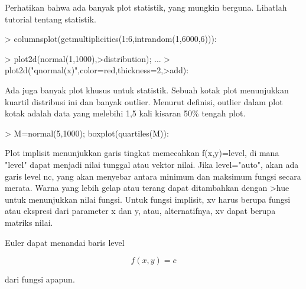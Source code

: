 \documentclass[a4paper,10pt]{article}
\begin{document}
\begin{eulernotebook}
\begin{eulercomment}
\begin{eulercomment}
\begin{eulercomment}
\begin{eulercomment}
\begin{eulercomment}
\begin{eulercomment}
\begin{eulerprompt}
\end{eulerprompt}
\begin{eulercomment}
Perhatikan bahwa ada banyak plot statistik, yang mungkin berguna.
Lihatlah tutorial tentang statistik.
\end{eulercomment}
\begin{eulerprompt}
> columnsplot(getmultiplicities(1:6,intrandom(1,6000,6))):
\end{eulerprompt}
\begin{eulerprompt}
> plot2d(normal(1,1000),>distribution); ...
>   plot2d("qnormal(x)",color=red,thickness=2,>add):
\end{eulerprompt}
\begin{eulercomment}
Ada juga banyak plot khusus untuk statistik. Sebuah kotak plot
menunjukkan kuartil distribusi ini dan banyak outlier. Menurut
definisi, outlier dalam plot kotak adalah data yang melebihi 1,5 kali
kisaran 50\% tengah plot.
\end{eulercomment}
\begin{eulerprompt}
> M=normal(5,1000); boxplot(quartiles(M)):
\end{eulerprompt}
\begin{eulercomment}
Plot implisit menunjukkan garis tingkat memecahkan f(x,y)=level, di
mana "level" dapat menjadi nilai tunggal atau vektor nilai. Jika
level="auto", akan ada garis level nc, yang akan menyebar antara
minimum dan maksimum fungsi secara merata. Warna yang lebih gelap atau
terang dapat ditambahkan dengan \textgreater{}hue untuk menunjukkan nilai fungsi.
Untuk fungsi implisit, xv harus berupa fungsi atau ekspresi dari
parameter x dan y, atau, alternatifnya, xv dapat berupa matriks nilai.

Euler dapat menandai baris level

\end{eulercomment}
\begin{eulerformula}
\[
f(x,y) = c
\]
\end{eulerformula}
\begin{eulercomment}
dari fungsi apapun.


\end{eulercomment}
\end{eulercomment}
\end{eulercomment}
\end{eulercomment}
\end{eulercomment}
\end{eulercomment}
\end{eulercomment}
\end{eulernotebook}
\end{document}

